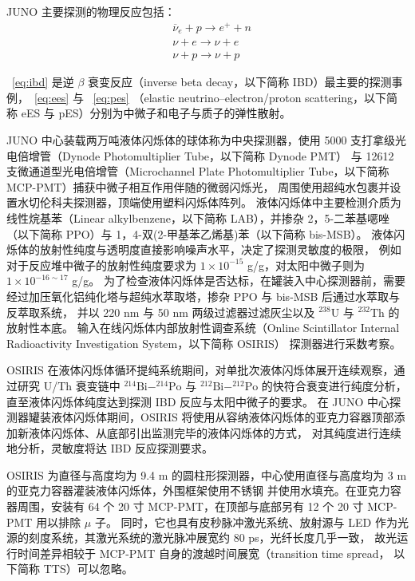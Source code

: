 JUNO 主要探测的物理反应包括：
\begin{align}
    &\overline{\nu}_e+p\rightarrow e^++n \label{eq:ibd}\\
    &\nu+e\rightarrow\nu+e \label{eq:ees}\\
    &\nu+p\rightarrow\nu+p \label{eq:pes}
\end{align}

~\eqref{eq:ibd} 是逆 $\beta$ 衰变反应（inverse beta decay，以下简称 IBD）最主要的探测事例，~\eqref{eq:ees} 与 ~\eqref{eq:pes}
（elastic neutrino–electron/proton scattering，以下简称 eES 与 pES）分别为中微子和电子与质子的弹性散射。

JUNO 中心装载两万吨液体闪烁体的球体称为中央探测器，使用 5000 支打拿级光电倍增管（Dynode Photomultiplier Tube，以下简称 Dynode PMT）
与 12612 支微通道型光电倍增管（Microchannel Plate Photomultiplier Tube，以下简称 MCP-PMT）捕获中微子相互作用伴随的微弱闪烁光，
周围使用超纯水包裹并设置水切伦科夫探测器，顶端使用塑料闪烁体阵列。
液体闪烁体中主要检测介质为线性烷基苯（Linear alkylbenzene，以下简称 LAB），并掺杂
2，5-二苯基𫫇唑（以下简称 PPO）与 1，4-双(2-甲基苯乙烯基)苯（以下简称 bis-MSB）。
液体闪烁体的放射性纯度与透明度直接影响噪声水平，决定了探测灵敏度的极限，
例如对于反应堆中微子的放射性纯度要求为 $1\times10^{-15}$ g/g，对太阳中微子则为 $1\times10^{-16\sim17}$ g/g。
为了检查液体闪烁体是否达标，在罐装入中心探测器前，需要经过加压氧化铝纯化塔与超纯水萃取塔，掺杂 PPO 与 bis-MSB 后通过水萃取与反萃取系统，
并以 220 nm 与 50 nm 两级过滤器过滤灰尘以及 $^{238}\text{U}$ 与 $^{232}\text{Th}$ 的放射性本底。
输入在线闪烁体内部放射性调查系统（Online Scintillator Internal Radioactivity Investigation System，以下简称 OSIRIS）
探测器\cite{junocollaborationDesignSensitivityJUNO2021}进行采数考察。

OSIRIS 在液体闪烁体循环提纯系统期间，对单批次液体闪烁体展开连续观察，通过研究 U/Th 衰变链中 $^{214}\text{Bi}-^{214}\text{Po}$ 与 
$^{212}\text{Bi}-^{212}\text{Po}$ 的快符合衰变进行纯度分析，直至液体闪烁体纯度达到探测 IBD 反应与太阳中微子的要求。
在 JUNO 中心探测器罐装液体闪烁体期间，OSIRIS 将使用从容纳液体闪烁体的亚克力容器顶部添加新液体闪烁体、从底部引出监测完毕的液体闪烁体的方式，
对其纯度进行连续地分析，灵敏度将达 IBD 反应探测要求。

OSIRIS 为直径与高度均为 9.4 m 的圆柱形探测器，中心使用直径与高度均为 3 m 的亚克力容器灌装液体闪烁体，外围框架使用不锈钢
并使用水填充。在亚克力容器周围，安装有 64 个 20 寸 MCP-PMT，在顶部与底部另有 12 个 20 寸 MCP-PMT 用以排除 $\mu$ 子。
同时，它也具有皮秒脉冲激光系统、放射源与 LED 作为光源的刻度系统，其激光系统的激光脉冲展宽约 80 ps，光纤长度几乎一致，
故光运行时间差异相较于 MCP-PMT 自身的渡越时间展宽（transition time spread， 以下简称 TTS）可以忽略。

